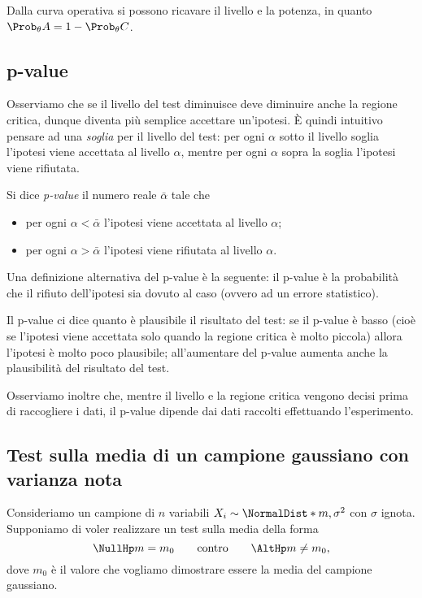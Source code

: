 Dalla curva operativa si possono ricavare il livello e la potenza, in quanto $\Prob_{\theta}{A} = 1 -\Prob_{\theta}{C}$.

\subsection*{p-value}

Osserviamo che se il livello del test diminuisce deve diminuire anche la regione critica, dunque diventa più semplice accettare un'ipotesi. È quindi intuitivo pensare ad una \emph{soglia} per il livello del test: per ogni $\alpha$ sotto il livello soglia l'ipotesi viene accettata al livello $\alpha$, mentre per ogni $\alpha$ sopra la soglia l'ipotesi viene rifiutata.

\begin{definition}
    [p-value] Si dice \emph{p-value} il numero reale $\bar\alpha$ tale che
    \begin{itemize}
        \item  per ogni $\alpha < \bar\alpha$ l'ipotesi viene accettata al livello $\alpha$;
        \item per ogni $\alpha > \bar\alpha$ l'ipotesi viene rifiutata al livello $\alpha$.
    \end{itemize} 
\end{definition}

Una definizione alternativa del p-value è la seguente: il p-value è la probabilità che il rifiuto dell'ipotesi sia dovuto al caso (ovvero ad un errore statistico).

Il p-value ci dice quanto è plausibile il risultato del test: se il p-value è basso (cioè se l'ipotesi viene accettata solo quando la regione critica è molto piccola) allora l'ipotesi è molto poco plausibile; all'aumentare del p-value aumenta anche la plausibilità del risultato del test.

Osserviamo inoltre che, mentre il livello e la regione critica vengono decisi prima di raccogliere i dati, il p-value dipende dai dati raccolti effettuando l'esperimento.

\subsection*{Test sulla media di un campione gaussiano con varianza nota}

Consideriamo un campione di $n$ variabili $X_i \sim \NormalDist*{m, \sigma^2}$ con $\sigma$ ignota. Supponiamo di voler realizzare un test sulla media della forma \[
    \NullHp m = m_0 \qquad \text{contro} \qquad \AltHp m \neq m_0,
\] dove $m_0$ è il valore che vogliamo dimostrare essere la media del campione gaussiano.


